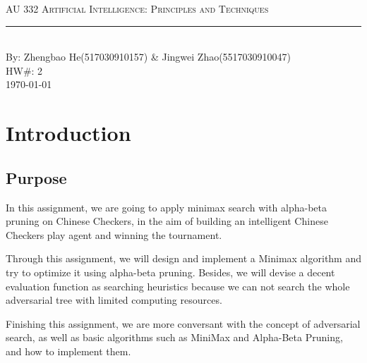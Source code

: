 \documentclass[aps,letterpaper,10pt]{article}
\newcommand{\labtitle}{AU 332 Artificial Intelligence: Principles and Techniques}
\newcommand{\authorname}{Zhengbao He(517030910157) \& Jingwei Zhao(5517030910047)}
\newcommand{\hw}{2}
\begin{document}


\begin{titlepage}
\begin{center}
{\Large \textsc{\labtitle} \\ \vspace{4pt}}
\rule[13pt]{\textwidth}{1pt} \\ \vspace{150pt}
{\large By: \authorname \\ \vspace{10pt}
HW\#: \hw \\ \vspace{10pt}
\today}
\end{center}
\end{titlepage}





\section{Introduction}
\subsection{Purpose}
In this assignment, we are going to apply minimax search with alpha-beta pruning on Chinese Checkers, in the aim of building an intelligent Chinese Checkers play agent and winning the tournament.

Through this assignment, we will design and implement a Minimax algorithm 
and try to optimize it using alpha-beta pruning. Besides, we will devise a decent evaluation function as searching heuristics because we can not search the whole adversarial tree with limited computing resources.

Finishing this assignment, we are more conversant with the concept of adversarial search, as well as basic algorithms such as MiniMax and Alpha-Beta Pruning, and how to implement them.

\vspace{3mm} %

\end{document}
